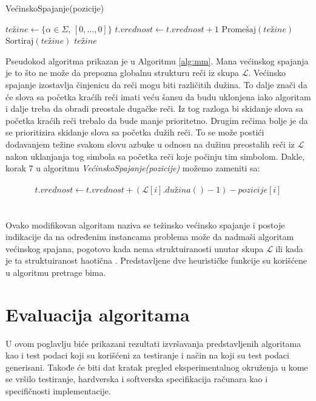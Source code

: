 \documentclass[12pt,oneside]{memoir}
\begin{document}
\begin{algorithm}
  \caption{\textrm{VećinskoSpajanje(pozicije)}}
  \label{alg:mm}
  \begin{algorithmic}[1]
  \State $te\textrm{ž}ine \gets \{\alpha \in \Sigma\textrm{, }[0,...,0] \}$ 
  \State
          \State $t.vrednost \gets t.vrednost + 1$
        \EndIf 
      \EndFor
    \EndIf 
  \EndFor
  \State
  \State $\textrm{Promešaj}(te\textrm{ž}ine)$
  \State $\textrm{Sortiraj}(te\textrm{ž}ine)$
  \State
  \State \Return $te\textrm{ž}ine$
  \end{algorithmic}
  \end{algorithm}

Pseudokod algoritma prikazan je u Algoritmu \ref{alg:mm}.
Mana većinskog spajanja je to što ne može da prepozna globalnu strukturu reči iz skupa $\mathcal{L}$.
Većinsko spajanje izostavlja činjenicu da reči mogu biti različitih dužina. To dalje 
znači da će slova sa početka kraćih reči imati veću šansu da budu uklonjena iako algoritam i dalje treba
da obradi preostale dugačke reči. Iz tog razloga bi skidanje slova sa početka kraćih reči trebalo da bude
manje prioritetno. Drugim rečima bolje je da se prioritizira skidanje slova sa početka dužih reči.
To se može postići dodavanjem težine svakom slovu azbuke u odnosu na dužinu preostalih reči iz $\mathcal{L}$ 
nakon uklanjanja tog simbola sa početka reči koje počinju tim simbolom. Dakle, korak 7 u algoritmu \textit{VećinskoSpajanje(pozicije)}
možemo zameniti sa:
\\
\\
\begin{equation}
  \label{eqn:wmm}
  t.vrednost \gets t.vrednost + (\mathcal{L}[i].du\textrm{ž}ina() - 1) - pozicije[i]
\end{equation}
\\
\\
Ovako modifikovan algoritam naziva se težinsko većinsko spajanje i postoje indikacije da na određenim instancama
problema može da nadmaši algoritam većinskog spajana, pogotovo kada nema struktuiranosti unutar skupa $\mathcal{L}$
ili kada je ta struktuiranost haotična \cite{ProbabilisticBS}. Predstavljene dve heurističke
funkcije su korišćene u algoritmu pretrage bima.

\chapter{Evaluacija algoritama}
\label{chap:evaluacijaAlg}
U ovom poglavlju biće prikazani rezultati izvršavanja predstavljenih algoritama
kao i test podaci koji su korišćeni za testiranje i način na koji su test podaci generisani.
Takođe će biti dat kratak pregled eksperimentalnog okruženja u kome se vršilo testiranje,
hardverska i softverska specifikacija računara kao i specifičnosti implementacije.
\end{document}
